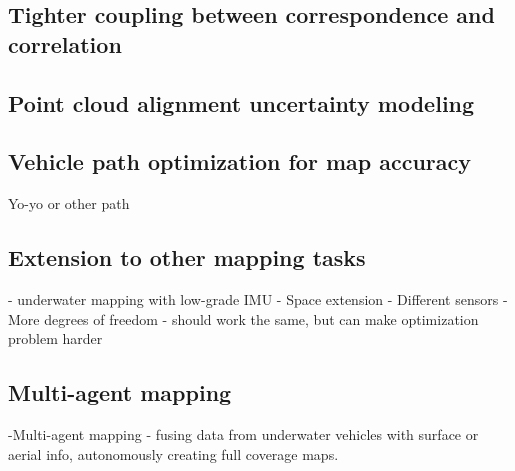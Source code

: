 \subsection{Tighter coupling between correspondence and correlation}

\subsection{Point cloud alignment uncertainty modeling}

\subsection{Vehicle path optimization for map accuracy}
Yo-yo or other path 

\subsection{Extension to other mapping tasks}
- underwater mapping with low-grade IMU 
- Space extension 
	- Different sensors
	- More degrees of freedom - should work the same, but can make optimization problem harder
	
\subsection{Multi-agent mapping}
-Multi-agent mapping
	- fusing data from underwater vehicles with surface or aerial info, autonomously creating full coverage maps.